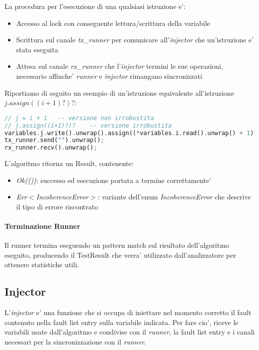 La procedura per l'esecuzione di una qualsiasi istruzione e':
\begin{itemize}
    \item Accesso al lock con conseguente lettura/scrittura della variabile
    \item Scrittura sul canale \textit{tx\_runner} per comunicare all'\textit{injector} che un'istruzione e' stata eseguita
    \item Attesa sul canale \textit{rx\_runner} che l'\textit{injector} termini le sue operazioni, necessario affinche' \textit{runner} e \textit{injector} rimangano sincronizzati
\end{itemize}

Riportiamo di seguito un esempio di un'istruzione equivalente all'istruzione $j.assign((i+1)?)?$:
\begin{lstlisting}[language=Rust, style=boxed]
// j = i + 1   -- versione non irrobustita
// j.assign((i+1)?)?    -- versione irrobustita
variables.j.write().unwrap().assign((*variables.i.read().unwrap() + 1)?)?;
tx_runner.send("").unwrap();
rx_runner.recv().unwrap();
\end{lstlisting}

L'algoritmo ritorna un Result, contenente:
\begin{itemize}
    \item \textit{Ok(())}: successo ed esecuzione portata a termine correttamente'
    \item \textit{Err$<$IncoherenceError$>$}: variante dell'enum \textit{IncoherenceError} che descrive il tipo di errore riscontrato 
\end{itemize}

\paragraph{Terminazione Runner}
Il runner termina eseguendo un pattern match sul risultato dell'algoritmo eseguito, producendo il TestResult che verra' utilizzato dall'analizzatore per ottenere statistiche utili.

\subsection{Injector}
L'\textit{injector} e' una funzione che si occupa di iniettare nel momento corretto il fault contenuto nella fault list entry sulla variabile indicata. Per fare cio', riceve le variabili usate dall'algoritmo e condivise con il \textit{runner}, la fault list entry e i canali necessari per la sincronizzazione con il \textit{runner}.

